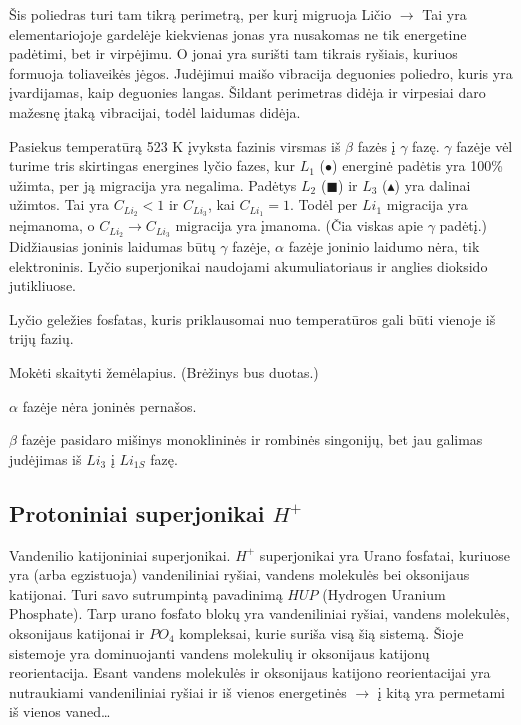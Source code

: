 Šis poliedras turi tam tikrą perimetrą, per kurį migruoja Ličio
\sun $\to$ \textdied Tai yra elementariojoje gardelėje kiekvienas jonas
yra nusakomas ne tik energetine padėtimi, bet ir virpėjimu. O jonai
yra surišti tam tikrais ryšiais, kuriuos formuoja toliaveikės jėgos.
Judėjimui maišo vibracija deguonies poliedro, kuris yra įvardijamas,
kaip deguonies langas. Šildant perimetras didėja ir virpesiai daro
mažesnę įtaką vibracijai, todėl laidumas didėja.

Pasiekus temperatūrą 523 K įvyksta fazinis virsmas iš
$\beta$ fazės į $\gamma$ fazę. $\gamma$ fazėje vėl turime
tris skirtingas energines lyčio fazes, kur $L_{1}$ ($\bullet$)
energinė padėtis yra 100\% užimta, per ją migracija yra negalima.
Padėtys $L_{2}$ ($\blacksquare$) ir $L_{3}$ ($\blacktriangle$) yra
dalinai užimtos. Tai yra $C_{Li_{2}} < 1$ ir $C_{Li_{3}}$, kai
$C_{Li_{1}} = 1$. Todėl per $Li_{1}$ migracija yra neįmanoma, o
$C_{Li_{2}} → C_{Li_{3}}$ migracija yra įmanoma. (Čia viskas apie
$\gamma$ padėtį.) Didžiausias joninis laidumas būtų $\gamma$
fazėje, $\alpha$ fazėje joninio laidumo nėra, tik elektroninis.
Lyčio superjonikai naudojami akumuliatoriaus ir anglies dioksido
jutikliuose.

\begin{remember}
  \item Lyčio geležies fosfatas, kuris priklausomai nuo temperatūros
    gali būti vienoje iš trijų fazių.
  \item Mokėti skaityti žemėlapius. (Brėžinys bus duotas.)
  \item $\alpha$ fazėje nėra joninės pernašos.
  \item $\beta$ fazėje pasidaro mišinys monoklininės ir rombinės
    singonijų, bet jau galimas judėjimas iš $Li_{3}$ į $Li_{1S}$ fazę.
\end{remember}

\subsection{Protoniniai superjonikai $H^{+}$}

Vandenilio katijoniniai superjonikai. $H^{+}$ superjonikai yra
Urano fosfatai, kuriuose yra (arba egzistuoja) vandeniliniai ryšiai,
vandens molekulės bei oksonijaus katijonai. Turi savo sutrumpintą
pavadinimą $HUP$ (Hydrogen Uranium Phosphate). Tarp urano fosfato
blokų yra vandeniliniai ryšiai, vandens molekulės, oksonijaus
katijonai ir $PO_{4}$ kompleksai, kurie suriša visą šią sistemą.
Šioje sistemoje yra dominuojanti vandens molekulių ir oksonijaus
katijonų reorientacija. Esant vandens molekulės ir oksonijaus
katijono reorientacijai yra nutraukiami vandeniliniai ryšiai ir 
iš vienos energetinės \sun $\to$ \textdied į kitą yra permetami iš
vienos vaned…

